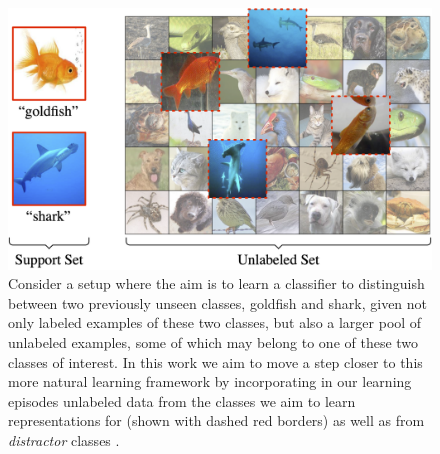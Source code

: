 \iflatexml
\begin{figure}
    \centering
    \includegraphics[width=6\textwidth]{figures/ssl_teaser_grid_distractor_fade_enlarge.png}
    \caption{Consider a setup where the aim is to learn a classifier to distinguish between two previously unseen classes, goldfish and shark, given not only labeled examples of these two classes, but also a larger pool of unlabeled examples, some of which may belong to one of these two classes of interest. %
    In this work we aim to move a step closer to this more natural learning framework by incorporating in our learning episodes unlabeled data from the classes we aim to learn representations for (shown with dashed red borders) as well as from {\it distractor} classes .}
    \label{fig:motivation}
    \vspace{-10pt}
\end{figure}
\else

